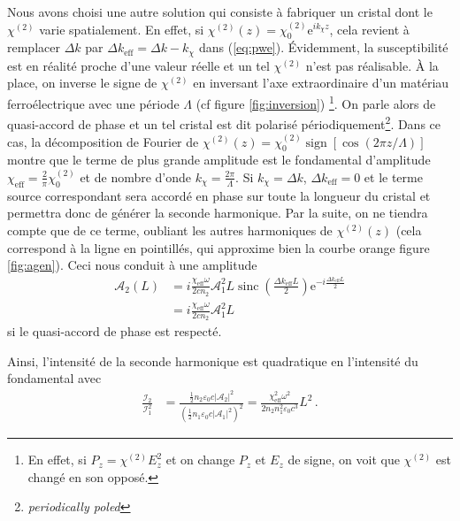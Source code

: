 \documentclass[11pt,a4paper]{article}
\newcommand{\A}{\mathcal{A}}
\newcommand{\e}[1]{\text{e}^{#1}}
\newcommand{\mathsc}[1]{\mathrm{\scriptscriptstyle {#1}}}
\begin{document}
Nous avons choisi une autre solution qui consiste à fabriquer un cristal dont le $\chi^{(2)}$ varie spatialement. En effet, si $\chi^{(2)}(z) = \chi^{(2)}_0 \e{i k_\chi z}$, cela revient à remplacer $\Delta k$ par $\boxed{ \Delta k_\mathsc{eff} = \Delta k - k_\chi }$ dans (\ref{eq:pwe}). 
Évidemment, la susceptibilité est en réalité proche d'une valeur réelle et un tel $\chi^{(2)}$ n'est pas réalisable. À la place, on inverse le signe de $\chi^{(2)}$ en inversant l'axe extraordinaire d'un matériau ferroélectrique avec une période $\Lambda$ (cf figure \ref{fig:inversion}) \footnote{En effet, si $P_z = \chi^{(2)} E_z^2$ et on change $P_z$ et $E_z$ de signe, on voit que $\chi^{(2)}$ est changé en son opposé.}.
On parle alors de quasi-accord de phase et un tel cristal est dit polarisé périodiquement\footnote{\textit{periodically poled}}. Dans ce cas, la décomposition de Fourier de $\chi^{(2)}(z) = \chi^{(2)}_0 \operatorname{sign}[\cos(2\pi z/ \Lambda)]$ montre que le terme de plus grande amplitude est le fondamental d'amplitude $\boxed{ \chi_\mathsc{eff} = \frac2\pi \chi^{(2)}_0 }$ et de nombre d'onde $\boxed{ k_\chi = \frac{2\pi}{\Lambda} }$. 
Si $k_\chi = \Delta k$, $\Delta k_\mathsc{eff} = 0$ et le terme source correspondant sera accordé en phase sur toute la longueur du cristal et permettra donc de générer la seconde harmonique. Par la suite, on ne tiendra compte que de ce terme, oubliant les autres harmoniques de $\chi^{(2)}(z)$ (cela correspond à la ligne en pointillés, qui approxime bien la courbe orange figure \ref{fig:agen}).
Ceci nous conduit à une amplitude 
\begin{align}
	\A_2(L) &= i \frac{\chi_\mathsc{eff}\omega}{2 cn_2} \A_1^2 L \operatorname{sinc}\left( \frac{\Delta k_\mathsc{eff} L}{2} \right) 
	\e{-i\frac{\Delta k_\mathsc{eff} L}{2}} \\	
	&= i \frac{\chi_\mathsc{eff} \omega}{2 cn_2} \A_1^2L 
\end{align}
si le quasi-accord de phase est respecté.

Ainsi, l'intensité de la seconde harmonique est quadratique en l'intensité du fondamental avec
\begin{align}
	\frac{\mathcal I_2}{\mathcal I_1^2} &= \frac{\frac12 n_2 \varepsilon_0 c |\A_2|^2}{\left(\frac12 n_1 \varepsilon_0 c |\A_1|^2\right)^2} 
	= \frac{\chi_\mathsc{eff}^2\omega^2}{2 n_2 n_1^2 \varepsilon_0 c^3} L^2 \,.
	\label{eq:plane}
\end{align}
\end{document}
